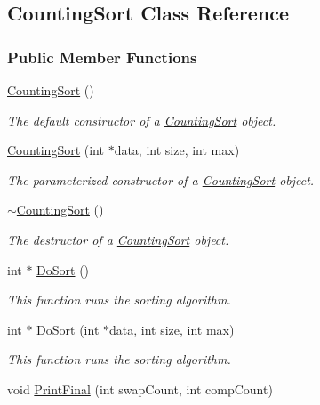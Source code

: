 \hypertarget{class_counting_sort}{}\subsection{Counting\+Sort Class Reference}
\label{class_counting_sort}
\subsubsection*{Public Member Functions}
\begin{DoxyCompactItemize}
\item 
\hyperlink{class_counting_sort_a535a1330331220653a34030805e67e30}{Counting\+Sort} ()
\begin{DoxyCompactList}\small\item\em The default constructor of a \hyperlink{class_counting_sort}{Counting\+Sort} object. \end{DoxyCompactList}\item 
\hyperlink{class_counting_sort_a1d66fa72e392e47b4262086d8a8d15a4}{Counting\+Sort} (int $\ast$data, int size, int max)
\begin{DoxyCompactList}\small\item\em The parameterized constructor of a \hyperlink{class_counting_sort}{Counting\+Sort} object. \end{DoxyCompactList}\item 
\hyperlink{class_counting_sort_a941a0d58043a739dda7d1c2959e6f954}{$\sim$\+Counting\+Sort} ()
\begin{DoxyCompactList}\small\item\em The destructor of a \hyperlink{class_counting_sort}{Counting\+Sort} object. \end{DoxyCompactList}\item 
int $\ast$ \hyperlink{class_counting_sort_a2d7bdd32c10208eb342238ca90506eff}{Do\+Sort} ()
\begin{DoxyCompactList}\small\item\em This function runs the sorting algorithm. \end{DoxyCompactList}\item 
int $\ast$ \hyperlink{class_counting_sort_a02f4cf3f6d7063f187354212b06bea0e}{Do\+Sort} (int $\ast$data, int size, int max)
\begin{DoxyCompactList}\small\item\em This function runs the sorting algorithm. \end{DoxyCompactList}\item 
void \hyperlink{class_counting_sort_af18bc4bb51834bdb972b7a6f5cd71325}{Print\+Final} (int swap\+Count, int comp\+Count)

\end{DoxyCompactItemize}
